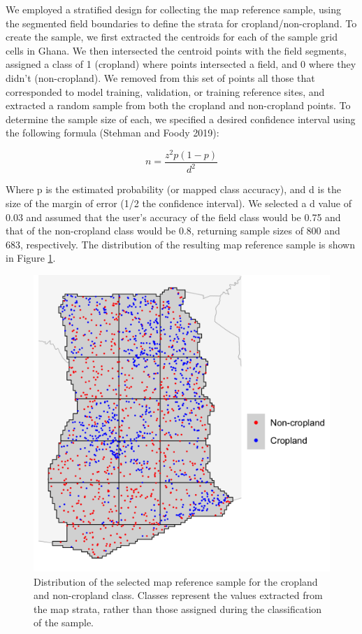 \documentclass[
  11pt,
  a4paper]{article}
\begin{document}
We employed a stratified design for collecting the map reference sample,
using the segmented field boundaries to define the strata for
cropland/non-cropland. To create the sample, we first extracted the
centroids for each of the sample grid cells in Ghana. We then
intersected the centroid points with the field segments, assigned a
class of 1 (cropland) where points intersected a field, and 0 where they
didn't (non-cropland). We removed from this set of points all those that
corresponded to model training, validation, or training reference sites,
and extracted a random sample from both the cropland and non-cropland
points. To determine the sample size of each, we specified a desired
confidence interval using the following formula (Stehman and Foody
2019):

\[n = \frac{z^2p(1-p)}{d^2}\]

Where p is the estimated probability (or mapped class accuracy), and d
is the size of the margin of error (1/2 the confidence interval). We
selected a d value of 0.03 and assumed that the user's accuracy of the
field class would be 0.75 and that of the non-cropland class would be
0.8, returning sample sizes of 800 and 683, respectively. The
distribution of the resulting map reference sample is shown in Figure
\ref{fig:refsample}.

\begin{figure}[!ht]

{\centering \includegraphics[width=0.8\linewidth,]{figures/si_map_reference_sample} 

}

\caption{Distribution of the selected map reference sample for the cropland and non-cropland class. Classes represent the values extracted from the map strata, rather than those assigned during the classification of the sample.}\label{fig:refsample}
\end{figure}
\end{document}
